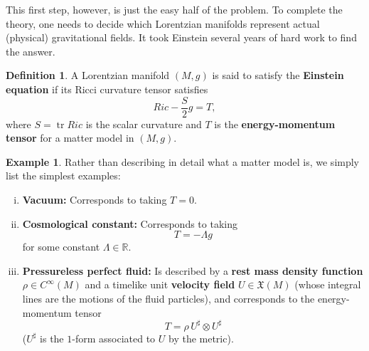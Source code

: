 \documentclass[12pt]{amsart}
\newcommand{\bbR}{\mathbb{R}}      %
\newcommand{\tr}{\operatorname{tr}}
\newcommand{\cX}{\mathfrak{X}}
\theoremstyle{definition}
\newtheorem{Def}[Thm]{Definition}
\newtheorem{Example}[Thm]{Example}
\theoremstyle{remark}
\begin{document}
This first step, however, is just the easy half of the problem. To complete the theory, one needs to decide which Lorentzian manifolds represent actual (physical) gravitational fields. It took Einstein several years of hard work to find the answer.

\begin{Def}
A Lorentzian manifold $(M,g)$ is said to satisfy the {\bf Einstein equation} if its Ricci curvature tensor satisfies
\[
Ric - \frac{S}2 g = T,
\]
where $S = \tr Ric$ is the scalar curvature and $T$ is the {\bf energy-momentum tensor} for a matter model in $(M,g)$.
\end{Def}

\begin{Example} \label{matter}
Rather than describing in detail what a matter model is, we simply list the simplest examples:
\begin{enumerate}[(i)]
\item
{\bf Vacuum:} Corresponds to taking $T=0$.
\item
{\bf Cosmological constant:} Corresponds to taking
\[
T = -\Lambda g
\]
for some constant $\Lambda \in \bbR$.
\item
{\bf Pressureless perfect fluid:} Is described by a {\bf rest mass density function} $\rho \in C^\infty(M)$ and a timelike unit {\bf velocity field} $U \in \cX(M)$ (whose integral lines are the motions of the fluid particles), and corresponds to the energy-momentum tensor
\[
T = \rho \, U^\sharp \otimes U^\sharp 
\]
($U^\sharp$ is the $1$-form associated to $U$ by the metric).
\end{enumerate}
\end{Example}
\end{document}
